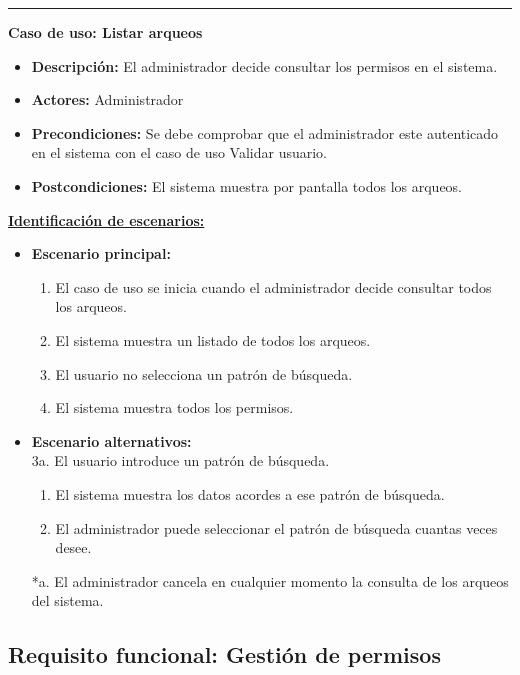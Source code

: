 \smallskip
\hrule height 1pt
\smallskip
\textbf{Caso de uso: Listar arqueos}
\begin{itemize}\renewcommand{\labelitemi}{$\cdot$}
 \item \textbf{Descripción:} El administrador decide consultar los permisos en el sistema.
  \item \textbf{Actores:} Administrador
  \item \textbf{Precondiciones:} Se debe comprobar que el administrador este autenticado en el sistema con el caso de uso Validar usuario.
  \item \textbf{Postcondiciones:} El sistema muestra por pantalla todos los arqueos.
\end{itemize}
\underline{\textbf{Identificación de escenarios:}}
\begin{itemize}\renewcommand{\labelitemi}{$\circ$}
 \item \textbf{Escenario principal:}
         \begin{enumerate}
          \item El caso de uso se inicia cuando el administrador decide consultar todos los arqueos.
          \item El sistema muestra un listado de todos los arqueos.
          \item El usuario no selecciona un patrón de búsqueda.
          \item El sistema muestra todos los permisos.
         \end{enumerate}
  \item \textbf{Escenario alternativos:}\\
  			3a. El usuario introduce un patrón de búsqueda.
  			\begin{enumerate}
  			\item El sistema muestra los datos acordes a ese patrón de búsqueda.
  			\item El administrador puede seleccionar el patrón de búsqueda cuantas veces desee.
  			\end{enumerate}
          *a. El administrador cancela en cualquier momento la consulta de los arqueos del sistema.
\end{itemize}

\subsection{Requisito funcional: Gestión de permisos}

